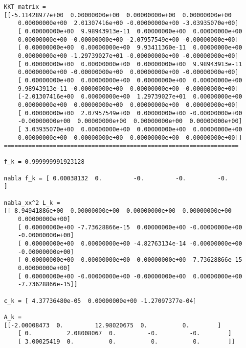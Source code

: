 \documentclass{article}
\begin{document}
\begin{verbatim}
KKT_matrix = 
[[-5.11428977e+00  0.00000000e+00  0.00000000e+00  0.00000000e+00
    0.00000000e+00  2.01307416e+00 -0.00000000e+00 -3.03935070e+00]
    [ 0.00000000e+00  9.98943913e-11  0.00000000e+00  0.00000000e+00
    0.00000000e+00 -0.00000000e+00 -2.07957549e+00 -0.00000000e+00]
    [ 0.00000000e+00  0.00000000e+00  9.93411360e-11  0.00000000e+00
    0.00000000e+00 -1.29739027e+01 -0.00000000e+00 -0.00000000e+00]
    [ 0.00000000e+00  0.00000000e+00  0.00000000e+00  9.98943913e-11
    0.00000000e+00 -0.00000000e+00  0.00000000e+00 -0.00000000e+00]
    [ 0.00000000e+00  0.00000000e+00  0.00000000e+00  0.00000000e+00
    9.98943913e-11 -0.00000000e+00  0.00000000e+00 -0.00000000e+00]
    [-2.01307416e+00  0.00000000e+00  1.29739027e+01  0.00000000e+00
    0.00000000e+00  0.00000000e+00  0.00000000e+00  0.00000000e+00]
    [ 0.00000000e+00  2.07957549e+00  0.00000000e+00 -0.00000000e+00
    -0.00000000e+00  0.00000000e+00  0.00000000e+00  0.00000000e+00]
    [ 3.03935070e+00  0.00000000e+00  0.00000000e+00  0.00000000e+00
    0.00000000e+00  0.00000000e+00  0.00000000e+00  0.00000000e+00]]
===================================================================

f_k = 0.999999991923128

nabla f_k = [ 0.00038132  0.         -0.         -0.         -0.        ]

nabla_xx^2 L_k = 
[[-8.94941886e+00  0.00000000e+00  0.00000000e+00  0.00000000e+00
    0.00000000e+00]
    [ 0.00000000e+00 -7.73628866e-15  0.00000000e+00 -0.00000000e+00
    -0.00000000e+00]
    [ 0.00000000e+00  0.00000000e+00 -4.82763134e-14 -0.00000000e+00
    -0.00000000e+00]
    [ 0.00000000e+00 -0.00000000e+00 -0.00000000e+00 -7.73628866e-15
    0.00000000e+00]
    [ 0.00000000e+00 -0.00000000e+00 -0.00000000e+00  0.00000000e+00
    -7.73628866e-15]]

c_k = [ 4.37736480e-05  0.00000000e+00 -1.27097377e-04]

A_k = 
[[-2.00008473  0.         12.98020675  0.          0.        ]
    [ 0.          2.08008067  0.         -0.         -0.        ]
    [ 3.00025419  0.          0.          0.          0.        ]]


\end{verbatim}
\end{document}
